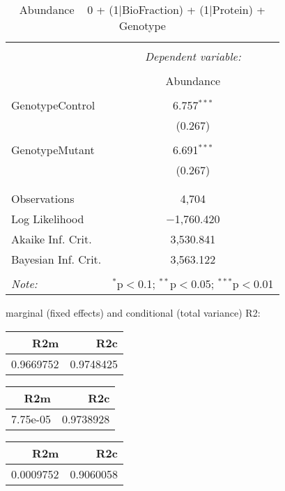 \documentclass[11pt]{report}
\begin{document}
\begin{table}[!htbp] \centering 
  \caption{Abundance ~ 0 + (1|BioFraction) + (1|Protein) + Genotype} 
  \label{} 
\begin{tabular}{@{\extracolsep{5pt}}lc} 
\\[-1.8ex]\hline 
\hline \\[-1.8ex] 
 & \multicolumn{1}{c}{\textit{Dependent variable:}} \\ 
\cline{2-2} 
\\[-1.8ex] & Abundance \\ 
\hline \\[-1.8ex] 
 GenotypeControl & 6.757$^{***}$ \\ 
  & (0.267) \\ 
  & \\ 
 GenotypeMutant & 6.691$^{***}$ \\ 
  & (0.267) \\ 
  & \\ 
\hline \\[-1.8ex] 
Observations & 4,704 \\ 
Log Likelihood & $-$1,760.420 \\ 
Akaike Inf. Crit. & 3,530.841 \\ 
Bayesian Inf. Crit. & 3,563.122 \\ 
\hline 
\hline \\[-1.8ex] 
\textit{Note:}  & \multicolumn{1}{r}{$^{*}$p$<$0.1; $^{**}$p$<$0.05; $^{***}$p$<$0.01} \\ 
\end{tabular} 
\end{table} 
marginal (fixed effects) and conditional (total variance) R2:

\begin{tabular}{r|r}
\hline
R2m & R2c\\
\hline
0.9669752 & 0.9748425\\
\hline
\end{tabular}

\begin{tabular}{r|r}
\hline
R2m & R2c\\
\hline
7.75e-05 & 0.9738928\\
\hline
\end{tabular}

\begin{tabular}{r|r}
\hline
R2m & R2c\\
\hline
0.0009752 & 0.9060058\\
\hline
\end{tabular}
\end{document}
